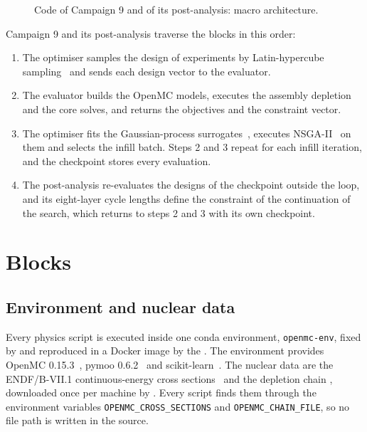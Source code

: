 \begin{figure}[htbp]
  \caption{Code of Campaign 9 and of its post-analysis: macro architecture.}
  \label{fig:code-architecture}
\end{figure}

Campaign 9 and its post-analysis traverse the blocks in this order:

\begin{enumerate}[nosep]
  \item The optimiser samples the design of experiments by Latin-hypercube
        sampling~\cite{mckay_lhs_1979} and sends each design vector to
        the evaluator.
  \item The evaluator builds the OpenMC models, executes the assembly
        depletion and the core solves, and returns the objectives and
        the constraint vector.
  \item The optimiser fits the Gaussian-process
        surrogates~\cite{rasmussen_gp_2006}, executes
        NSGA-II~\cite{deb_nsga2_2002} on them and selects the infill
        batch. Steps 2 and 3 repeat for each infill iteration, and the
        checkpoint stores every evaluation.
  \item The post-analysis re-evaluates the designs of the checkpoint
        outside the loop, and its eight-layer cycle lengths define the
        constraint of the continuation of the search, which returns to
        steps 2 and 3 with its own checkpoint.
\end{enumerate}

\section{Blocks}\label{sec:arch-blocks}

\subsection{Environment and nuclear data}

Every physics script is executed inside one conda environment,
\texttt{openmc-env}, fixed by  and reproduced in a
Docker image by the . The environment provides OpenMC
0.15.3~\cite{romano_openmc_2015,romano_2021_depletion}, pymoo
0.6.2~\cite{blank_deb_2020} and scikit-learn~\cite{pedregosa_sklearn_2011}.
The nuclear data are the ENDF/B-VII.1 continuous-energy cross
sections~\cite{chadwick_endf71_2011} and the depletion chain
, downloaded once per machine by
. Every script finds them through the environment
variables \texttt{OPENMC\_CROSS\_SECTIONS} and
\texttt{OPENMC\_CHAIN\_FILE}, so no file path is written in the source.

